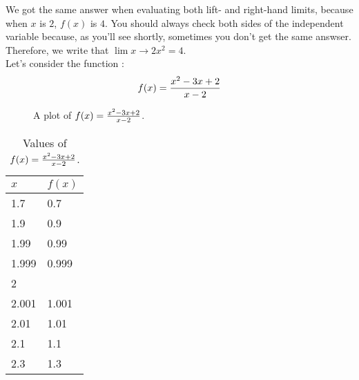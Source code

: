 We got the same answer when evaluating both lift- and right-hand limits, because when $x$ is $2$, $f(x)$ is $4$. You should always check both sides of the independent variable because, as you'll see shortly, sometimes you don't get the same answser. Therefore, we write that $\lim\limits{x\to 2}x^2 = 4$.\\

Let's consider the function \cite{mooc}:
$$f(x)=\protect\frac{x^2 - 3x + 2}{x-2}$$

\begin{multicols}{2}
\begin{figure}[H]
	\caption{A plot of $f(x)=\protect\frac{x^2 - 3x + 2}{x-2}$.}
	\label{plot:(x^2 - 3x + 2)/(x-2)}
\end{figure}

\vspace*{\fill}
\begin{table}[H]
	\centering
	\begin{tabular}{l l}
		\toprule
		\textbf{$x$} & \textbf{$f(x)$} \\
		\midrule
 		1.7 	&  0.7 		\\
 		1.9 	&  0.9 		\\
 		1.99 	&  0.99 	\\
 		1.999 	&  0.999 	\\
		2 		&  \text{undefined} \\
		2.001	&  1.001	\\
		2.01	&  1.01		\\
		2.1 	&  1.1 		\\
		2.3 	&  1.3 		\\
		\bottomrule
	\end{tabular}
\caption{Values of $f(x)=\protect\frac{x^2 - 3x + 2}{x-2}$.}
\end{table}
\vspace*{\fill}
\end{multicols}

